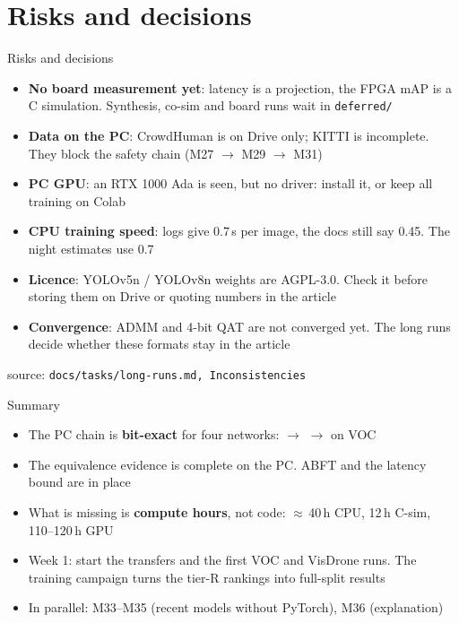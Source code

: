 \documentclass[aspectratio=169,11pt]{beamer}
\newcommand\src[1]{\par\vfill{\tiny\color{gray}source: \texttt{#1}}}
\begin{document}
\section{Risks and decisions}

\begin{frame}{Risks and decisions}
  \footnotesize
  \begin{itemize}
    \item \textbf{No board measurement yet}: latency is a projection, the FPGA mAP is a C
      simulation. Synthesis, co-sim and board runs wait in \texttt{deferred/}
    \item \textbf{Data on the PC}: CrowdHuman is on Drive only; KITTI is incomplete. They
      block the safety chain (M27 $\to$ M29 $\to$ M31)
    \item \textbf{PC GPU}: an RTX 1000 Ada is seen, but no driver: install it, or keep all
      training on Colab
    \item \textbf{CPU training speed}: logs give 0.7\,s per image, the docs still say 0.45. The
      night estimates use 0.7
    \item \textbf{Licence}: YOLOv5n / YOLOv8n weights are AGPL-3.0. Check it before
      storing them on Drive or quoting numbers in the article
    \item \textbf{Convergence}: ADMM and 4-bit QAT are not converged yet. The long runs
      decide whether these formats stay in the article
  \end{itemize}
  \src{docs/tasks/long-runs.md, Inconsistencies}
\end{frame}

\begin{frame}{Summary}
  \begin{itemize}
    \item The PC chain is \textbf{bit-exact} for four networks:
       $\to$  $\to$ 
      on VOC
    \item The equivalence evidence is complete on the PC. ABFT and the latency bound are in
      place
    \item What is missing is \textbf{compute hours}, not code: $\approx$\,40\,h CPU,
      12\,h C-sim, 110--120\,h GPU
    \item Week 1: start the transfers and the first VOC and VisDrone runs. The training
      campaign turns the tier-R rankings into full-split results
    \item In parallel: M33--M35 (recent models without PyTorch), M36 (explanation)
  \end{itemize}
\end{frame}
\end{document}
